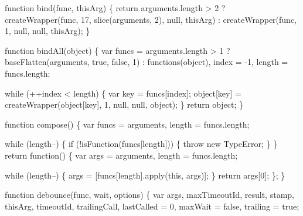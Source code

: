 \begin{DoxyCodeInclude}
{{  \textcolor{keyword}{function} bind(func, thisArg) \{
    \textcolor{keywordflow}{return} arguments.length > 2
      ? createWrapper(func, 17, slice(arguments, 2), null, thisArg)
      : createWrapper(func, 1, null, null, thisArg);
  \}

  \textcolor{keyword}{function} bindAll(\textcolor{keywordtype}{object}) \{
    var funcs = arguments.length > 1 ? baseFlatten(arguments, \textcolor{keyword}{true}, \textcolor{keyword}{false}, 1) : functions(object),
        index = -1,
        length = funcs.length;

    \textcolor{keywordflow}{while} (++index < length) \{
      var key = funcs[index];
      \textcolor{keywordtype}{object}[key] = createWrapper(\textcolor{keywordtype}{object}[key], 1, null, null, \textcolor{keywordtype}{object});
    \}
    \textcolor{keywordflow}{return} object;
  \}

  \textcolor{keyword}{function} compose() \{
    var funcs = arguments,
        length = funcs.length;

    \textcolor{keywordflow}{while} (length--) \{
      \textcolor{keywordflow}{if} (!isFunction(funcs[length])) \{
        \textcolor{keywordflow}{throw} \textcolor{keyword}{new} TypeError;
      \}
    \}
    \textcolor{keywordflow}{return} \textcolor{keyword}{function}() \{
      var args = arguments,
          length = funcs.length;

      \textcolor{keywordflow}{while} (length--) \{
        args = [funcs[length].apply(\textcolor{keyword}{this}, args)];
      \}
      \textcolor{keywordflow}{return} args[0];
    \};
  \}

  \textcolor{keyword}{function} debounce(func, wait, options) \{
    var args,
        maxTimeoutId,
        result,
        stamp,
        thisArg,
        timeoutId,
        trailingCall,
        lastCalled = 0,
        maxWait = \textcolor{keyword}{false},
        trailing = \textcolor{keyword}{true};

}}
\end{DoxyCodeInclude}
